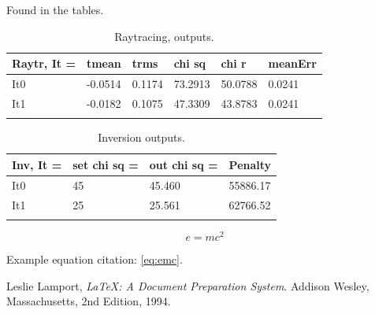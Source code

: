 \documentclass[fontsize=11pt, %
                             paper=a4, %
                             twoside, %
                             captions=tableheading,
                             index=totoc,
                             hyperref]{labbook}
\begin{document}
\begin{addmargin}[4cm]{0cm}

Found in the tables.
\begin{table}[ht]
\label{tab:r0}
\raggedleft
\begin{tabular}{l l l l l l}
\toprule
\textbf{Raytr, It = } & \textbf{tmean} & \textbf{trms} & \textbf{chi sq} & \textbf{chi r} & \textbf{meanErr} \\
\toprule
It0 & -0.0514 & 0.1174 & 73.2913 & 50.0788 & 0.0241\\
It1 & -0.0182 & 0.1075 & 47.3309 & 43.8783 & 0.0241\\
\bottomrule\\
\end{tabular}
\caption{Raytracing, outputs.}
\end{table}

\begin{table}[ht]
\label{tab:i0}
\raggedleft
\begin{tabular}{l l l l}
\toprule
\textbf{Inv, It = } & \textbf{set chi sq =} & \textbf{out chi sq =} & \textbf{Penalty} \\
\toprule
It0 & 45 & 45.460 & 55886.17\\
It1 & 25 & 25.561 & 62766.52 \\
\bottomrule\\
\end{tabular}
\caption{Inversion outputs.}
\end{table}





\begin{equation}
\label{eq:emc}
e = mc^2
\end{equation}

Example equation citation: \autoref{eq:emc}.

 
\end{addmargin}


\begin{thebibliography}{9}

Leslie Lamport,
\emph{\LaTeX: A Document Preparation System}.
Addison Wesley, Massachusetts,
2nd Edition,
1994.

\end{thebibliography}

\end{document}
